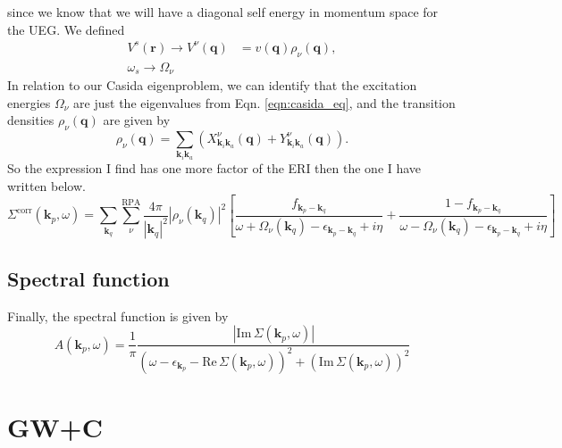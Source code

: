 since we know that we will have a diagonal self energy in momentum space for the UEG. We defined
\begin{align}
    V^s(\mathbf{r}) \rightarrow V^\nu(\mathbf{q}) &= v(\mathbf{q}) \rho_\nu(\mathbf{q}) , \\
    \omega_s \rightarrow \Omega_\nu 
\end{align}
In relation to our Casida eigenproblem, we can identify that the excitation energies $\Omega_\nu$ are just the eigenvalues from Eqn. \ref{eqn:casida_eq}, and the transition densities $\rho_\nu(\bm{q})$ are given by
\begin{equation}
    \rho_{\nu}(\bm{q}) = \sum_{\bm{k}_i \bm{k}_a} (X_{\bm{k}_i \bm{k}_a}^\nu(\bm{q}) + Y_{\bm{k}_i \bm{k}_a}^\nu(\bm{q})).
\end{equation}
So the expression I find has one more factor of the ERI then the one I have written below.
\begin{equation}
    \Sigma^{\text{corr}}(\bm{k}_p,\omega) = \sum_{\bm{k}_q}\sum_{\nu }^{\text{RPA}} \frac{4\pi}{|\bm{k}_q|^2} |\rho_\nu(\bm{k}_q)|^2 \left[ \frac{f_{\bm{k}_p - \bm{k}_q}}{\omega + \Omega_\nu(\bm{k}_q) - \epsilon_{\bm{k}_p - \bm{k}_q} + i\eta} + \frac{1 - f_{\bm{k}_p - \bm{k}_q}}{\omega - \Omega_\nu(\bm{k}_q) - \epsilon_{\bm{k}_p - \bm{k}_q} + i\eta} \right]
\end{equation}
\subsection{Spectral function}
Finally, the spectral function is given by
\begin{equation}
    A(\bm{k}_p,\omega) = \frac{1}{\pi} \frac{|\text{Im}\,\Sigma(\bm{k}_p,\omega)|}{\left(\omega - \epsilon_{\bm{k}_p} - \text{Re}\,\Sigma(\bm{k}_p,\omega)\right)^2 + \left(\text{Im}\,\Sigma(\bm{k}_p,\omega)\right)^2}
\end{equation}
\section{GW+C}
